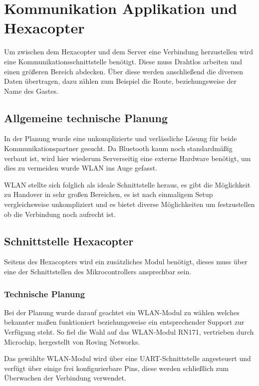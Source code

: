 \chapter{Kommunikation Applikation und Hexacopter}
\renewcommand{\kapitelautor}{Autor: Katharina Joksch, Lucas Ullrich}
Um zwischen dem Hexacopter und dem Server eine Verbindung herzustellen wird eine Kommunikationsschnittstelle benötigt. Diese muss Drahtlos arbeiten und einen größeren Bereich
abdecken. Über diese werden anschließend die diversen Daten übertragen, dazu zählen zum Beispiel die Route, beziehungsweise der Name des Gastes.

\section{Allgemeine technische Planung}
In der Planung wurde eine unkomplizierte und verlässliche Lösung für beide Kommunikationspartner gesucht. Da Bluetooth kaum noch standardmäßig verbaut ist, wird hier wiederum
Serverseitig eine externe Hardware benötigt, um dies zu vermeiden wurde WLAN ins Auge gefasst.

WLAN stellte sich folglich als ideale Schnittstelle heraus,
es gibt die Möglichkeit zu Handover in sehr großen Bereichen, es ist nach einmaligem Setup vergleichsweise unkompliziert und es bietet diverse Möglichkeiten um festzustellen
ob die Verbindung noch aufrecht ist.

\section{Schnittstelle Hexacopter}
Seitens des Hexacopters wird ein zusätzliches Modul benötigt, dieses muss über eine der Schnittstellen des Mikrocontrollers ansprechbar sein.

  \subsection{Technische Planung}
  Bei der Planung wurde darauf geachtet ein WLAN-Modul zu wählen welches bekannter maßen funktioniert beziehungsweise ein entsprechender Support zur Verfügung steht.
  So fiel die Wahl auf das WLAN-Modul RN171, vertrieben durch Microchip, hergestellt von Roving Networks.

  Das gewählte WLAN-Modul wird über eine UART-Schnittstelle angesteuert und verfügt über einige frei konfigurierbare Pins, diese werden schließlich zum Überwachen der
  Verbindung verwendet.

